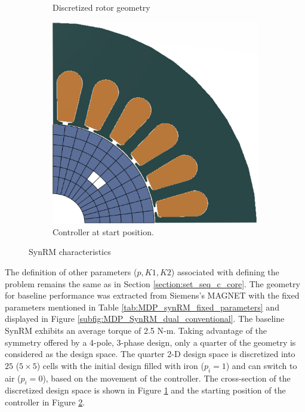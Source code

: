 \begin{figure}[h!]
\begin{subfigure}{0.3\textwidth}
        \caption{Discretized rotor geometry}
        \label{subfig:MDP_SynRM_dual_blank2}
    \end{subfigure}
    \begin{subfigure}{0.3\textwidth}
        \centering
        \includegraphics[width=\linewidth]{Figures/Ch_MDP/SynRM_dual_start2_small.png}
        \caption{Controller at start position.}
        \label{subfig:MDP_SynRM_dual_start2}
    \end{subfigure}
    \caption{SynRM characteristics}
    \label{fig:MDP_SynRM_characteristics}
\end{figure}

The definition of other parameters ($p,K1,K2$) associated with defining the problem remains the same as in Section \ref{section:set_seq_c_core}. The geometry for baseline performance was extracted from Siemens's MAGNET \parencite{Magnet}  with the fixed parameters mentioned in Table \ref{tab:MDP_synRM_fixed_parameters} and displayed in Figure \ref{subfig:MDP_SynRM_dual_conventional}. The baseline SynRM exhibits an average torque of 2.5 N-m. Taking advantage of the symmetry offered by a 4-pole, 3-phase design, only a quarter of the geometry is considered as the design space. The quarter 2-D design space is discretized into $25$ ($5 \times 5$) cells with the initial design filled with iron ($p_i=1$) and can switch to air ($p_i=0$), based on the movement of the controller. The cross-section of the discretized design space is shown in Figure \ref{subfig:MDP_SynRM_dual_blank2} and the starting position of the controller in Figure \ref{subfig:MDP_SynRM_dual_start2}.

